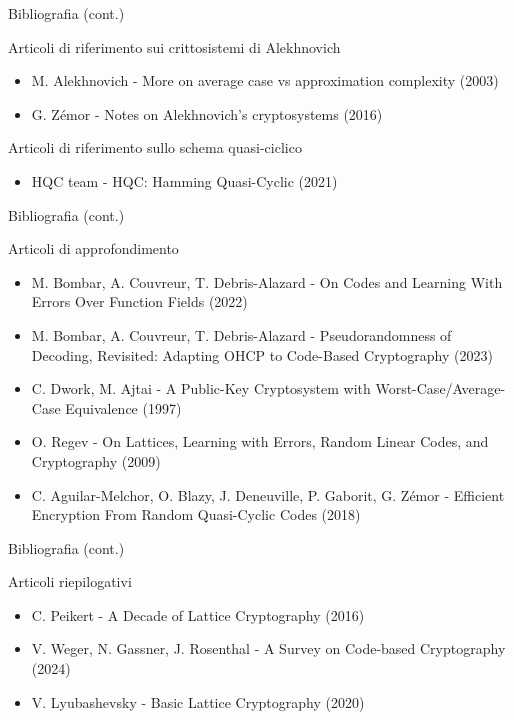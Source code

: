 \documentclass[10pt]{beamer}
\begin{document}
		\begin{frame}{Bibliografia (cont.)}
			\begin{block}{Articoli di riferimento sui crittosistemi di Alekhnovich}
				\begin{itemize}
					\item M. Alekhnovich - More on average case vs approximation complexity (2003)
					\item G. Zémor - Notes on Alekhnovich’s cryptosystems (2016)
				\end{itemize}
			\end{block}
			\begin{block}{Articoli di riferimento sullo schema quasi-ciclico}
				\begin{itemize}
					\item HQC team - HQC: Hamming Quasi-Cyclic (2021)
				\end{itemize}
			\end{block}
		\end{frame}
		\begin{frame}{Bibliografia (cont.)}
			\begin{block}{Articoli di approfondimento}
				\begin{itemize}
					\item M. Bombar, A. Couvreur, T. Debris-Alazard - On Codes and Learning With Errors Over
					Function Fields (2022)
					\item M. Bombar, A. Couvreur, T. Debris-Alazard - Pseudorandomness of Decoding, Revisited:
					Adapting OHCP to Code-Based Cryptography (2023)
					\item C. Dwork, M. Ajtai - A Public-Key Cryptosystem with Worst-Case/Average-Case 
					Equivalence (1997)
					\item O. Regev - On Lattices, Learning with Errors, Random Linear Codes, and Cryptography (2009)
					\item C. Aguilar-Melchor, O. Blazy, J. Deneuville, P. Gaborit, G. Zémor - Efficient Encryption
					From Random Quasi-Cyclic Codes (2018)
				\end{itemize}
			\end{block}
		\end{frame}
		\begin{frame}{Bibliografia (cont.)}
			\begin{block}{Articoli riepilogativi}
				\begin{itemize}
					\item C. Peikert - A Decade of Lattice Cryptography (2016)
					\item V. Weger, N. Gassner, J. Rosenthal - A Survey on Code-based Cryptography (2024)
					\item V. Lyubashevsky - Basic Lattice Cryptography (2020)
				\end{itemize}
			\end{block}
		\end{frame}
\end{document}
